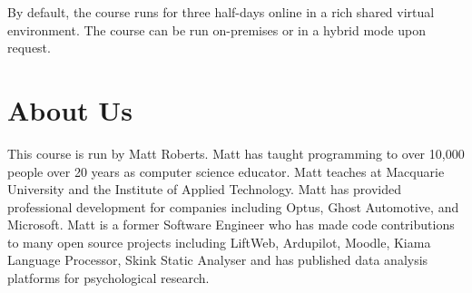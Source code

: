 \documentclass[twoside=false,DIV=14]{scrartcl}
\begin{document}
By default, the course runs for three half-days online in a rich shared virtual environment.  The course can be run on-premises or in a hybrid mode upon request.

\section{About Us}
This course is run by Matt Roberts.  Matt has taught programming to over 10,000 people over 20 years as computer science educator.  Matt teaches at Macquarie University and the Institute of Applied Technology.  Matt has provided professional development for companies including Optus, Ghost Automotive, and Microsoft.  Matt is a former Software Engineer who has made code contributions to many open source projects including LiftWeb, Ardupilot, Moodle, Kiama Language Processor, Skink Static Analyser and has published data analysis platforms for psychological research.
\end{document}
